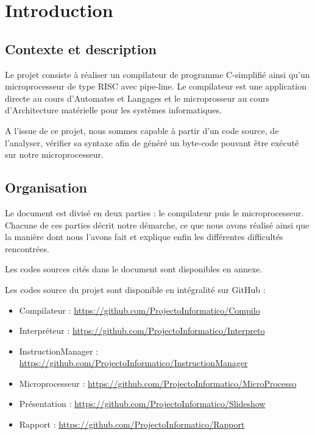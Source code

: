 
\section{Introduction}

    \subsection{Contexte et description}
    
    Le projet consiste à réaliser un compilateur de programme C-simplifié ainsi qu'un microprocesseur de type RISC avec pipe-line. Le compilateur est une application directe au cours d'Automates et Langages et le microprosseur au cours d'Architecture matérielle pour les systèmes informatiques.
    
    A l'issue de ce projet, nous sommes capable à partir d'un code source, de l'analyser, vérifier sa syntaxe afin de généré un byte-code pouvant être exécuté sur notre microprocesseur. 
    
    \subsection{Organisation}

    Le document est divisé en deux parties : le compilateur puis le microprocesseur. Chacune de ces parties décrit notre démarche, ce que nous avons réalisé ainsi que la manière dont nous l'avons fait et explique enfin les différentes difficultés rencontrées.

    Les codes sources cités dans le document sont disponibles en annexe.

    Les codes source du projet sont disponible en intégralité sur GitHub : 
    \begin{itemize}
    \item Compilateur : \url{https://github.com/ProjectoInformatico/Compilo}
    \item Interpréteur : \url{https://github.com/ProjectoInformatico/Interpreto}
    \item InstructionManager : \url{https://github.com/ProjectoInformatico/InstructionManager}
    \item Microprocesseur : \url{https://github.com/ProjectoInformatico/MicroProcesso}
    \item Présentation : \url{https://github.com/ProjectoInformatico/Slideshow}
    \item Rapport : \url{https://github.com/ProjectoInformatico/Rapport}
    \end{itemize}
